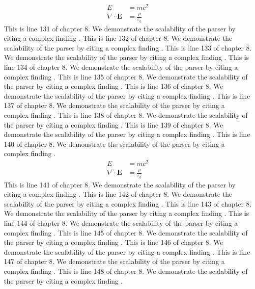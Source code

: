 \begin{align*}
  E &= mc^2 \\
  \nabla \cdot \mathbf{E} &= \frac{\rho}{\varepsilon_0}
\end{align*}
This is line 131 of chapter 8. We demonstrate the scalability of the parser by citing a complex finding \cite{ref8_131}.
This is line 132 of chapter 8. We demonstrate the scalability of the parser by citing a complex finding \cite{ref8_132}.
This is line 133 of chapter 8. We demonstrate the scalability of the parser by citing a complex finding \cite{ref8_133}.
This is line 134 of chapter 8. We demonstrate the scalability of the parser by citing a complex finding \cite{ref8_134}.
This is line 135 of chapter 8. We demonstrate the scalability of the parser by citing a complex finding \cite{ref8_135}.
This is line 136 of chapter 8. We demonstrate the scalability of the parser by citing a complex finding \cite{ref8_136}.
This is line 137 of chapter 8. We demonstrate the scalability of the parser by citing a complex finding \cite{ref8_137}.
This is line 138 of chapter 8. We demonstrate the scalability of the parser by citing a complex finding \cite{ref8_138}.
This is line 139 of chapter 8. We demonstrate the scalability of the parser by citing a complex finding \cite{ref8_139}.
This is line 140 of chapter 8. We demonstrate the scalability of the parser by citing a complex finding \cite{ref8_140}.
\begin{align*}
  E &= mc^2 \\
  \nabla \cdot \mathbf{E} &= \frac{\rho}{\varepsilon_0}
\end{align*}
This is line 141 of chapter 8. We demonstrate the scalability of the parser by citing a complex finding \cite{ref8_141}.
This is line 142 of chapter 8. We demonstrate the scalability of the parser by citing a complex finding \cite{ref8_142}.
This is line 143 of chapter 8. We demonstrate the scalability of the parser by citing a complex finding \cite{ref8_143}.
This is line 144 of chapter 8. We demonstrate the scalability of the parser by citing a complex finding \cite{ref8_144}.
This is line 145 of chapter 8. We demonstrate the scalability of the parser by citing a complex finding \cite{ref8_145}.
This is line 146 of chapter 8. We demonstrate the scalability of the parser by citing a complex finding \cite{ref8_146}.
This is line 147 of chapter 8. We demonstrate the scalability of the parser by citing a complex finding \cite{ref8_147}.
This is line 148 of chapter 8. We demonstrate the scalability of the parser by citing a complex finding \cite{ref8_148}.
